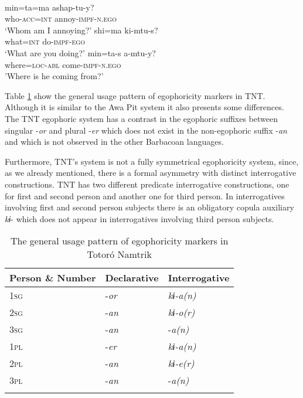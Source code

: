 \documentclass[output=paper]{langsci/langscibook}
\begin{document}
\ea 
{}\\ 
	\ea \label{ex:gg26}
    \gll min=ta=ma ashap-tu-y?\\
         who-\textsc{acc=int} annoy-\textsc{impf-n.ego}\\
    \glt ‘Whom am I annoying?’
  \ex \label{ex:gg27}
    \gll shi=ma 	ki-mtu-s?\\
   	what=\textsc{int} do-\textsc{impf}-\textsc{ego}\\    
   	\glt ‘What are you doing?’
   \ex \label{ex:gg28}
   \gll min=ta-s a-mtu-y?\\
   where=\textsc{loc-abl} 	come-\textsc{impf-n.ego}\\
   \glt 'Where is he coming from?'
\z \z

Table \ref{tab:gg7} show the general usage pattern of egophoricity markers in TNT. Although it is similar to the Awa Pit system it also presents some differences. The TNT egophoric system has a contrast in the egophoric suffixes between singular -\textit{or} and plural -\textit{er} which does not exist in the non-egophoric suffix -\textit{an} and which is not observed in the other Barbacoan languages. 

Furthermore, TNT’s system is not a fully symmetrical egophoricity system, since, as we already mentioned, there is a formal asymmetry with distinct interrogative constructions. TNT has two different predicate interrogative constructions, one for first and second person and another one for third person. In interrogatives involving first and second person subjects there is an obligatory copula auxiliary \textit{kɨ}- which does not appear in interrogatives involving third person subjects.

\begin{table}
\begin{tabularx}{\textwidth}{XXX}
\lsptoprule
\textbf{Person \& Number} & \textbf{Declarative} & \textbf{Interrogative}\\
\midrule
1\textsc{sg} & -\textit{or} & \textit{kɨ-a(n)}\\
2\textsc{sg} & -\textit{an} & \textit{kɨ-o(r)}\\
3\textsc{sg} & -\textit{an} & -\textit{a(n)}\\
\hline
1\textsc{pl} & -\textit{er} & \textit{kɨ-a(n)}\\
2\textsc{pl} & -\textit{an} & \textit{kɨ-e(r)}\\
3\textsc{pl} & -\textit{an} & -\textit{a(n)}\\
\lspbottomrule
\end{tabularx}
\caption{The general usage pattern of egophoricity markers in Totoró Namtrik}
\label{tab:gg7}
\end{table}
\end{document}
